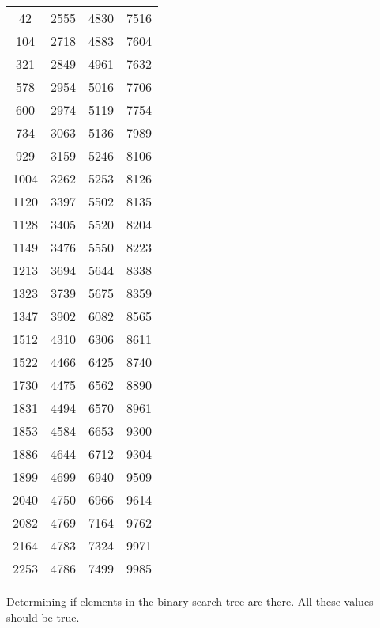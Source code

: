 \documentclass[12pt]{scrartcl}
\begin{document}
\begin{center}
    \begin{tabular}{cccc}
        42   & 2555 & 4830 & 7516 \\
        104  & 2718 & 4883 & 7604 \\
        321  & 2849 & 4961 & 7632 \\
        578  & 2954 & 5016 & 7706 \\
        600  & 2974 & 5119 & 7754 \\
        734  & 3063 & 5136 & 7989 \\
        929  & 3159 & 5246 & 8106 \\
        1004 & 3262 & 5253 & 8126 \\
        1120 & 3397 & 5502 & 8135 \\
        1128 & 3405 & 5520 & 8204 \\
        1149 & 3476 & 5550 & 8223 \\
        1213 & 3694 & 5644 & 8338 \\
        1323 & 3739 & 5675 & 8359 \\
        1347 & 3902 & 6082 & 8565 \\
        1512 & 4310 & 6306 & 8611 \\
        1522 & 4466 & 6425 & 8740 \\
        1730 & 4475 & 6562 & 8890 \\
        1831 & 4494 & 6570 & 8961 \\
        1853 & 4584 & 6653 & 9300 \\
        1886 & 4644 & 6712 & 9304 \\
        1899 & 4699 & 6940 & 9509 \\
        2040 & 4750 & 6966 & 9614 \\
        2082 & 4769 & 7164 & 9762 \\
        2164 & 4783 & 7324 & 9971 \\
        2253 & 4786 & 7499 & 9985 \\
    \end{tabular}
\end{center}

\subproblem{}
Determining if elements in the binary search tree are there. All these values should be true.
\end{document}
